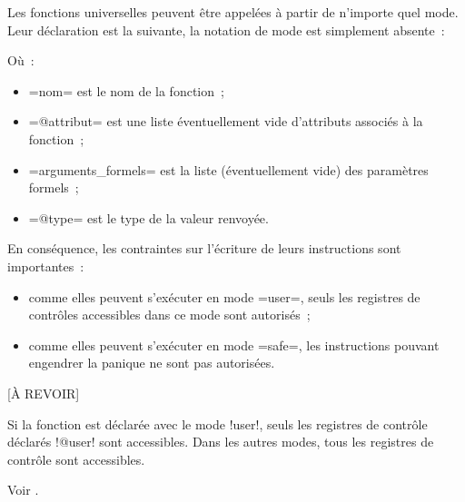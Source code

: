 
Les fonctions universelles peuvent être appelées à partir de n'importe quel mode. Leur déclaration est la suivante, la notation de mode est simplement absente~:

Où~:
\begin{itemize}
  \item \plm=nom= est le nom de la fonction~;
  \item \plm=@attribut= est une liste éventuellement vide d'attributs associés à la fonction~;
  \item \plm=arguments_formels= est la liste (éventuellement vide) des paramètres formels~;
  \item \plm=@type= est le type de la valeur renvoyée.
\end{itemize}

En conséquence, les contraintes sur l'écriture de leurs instructions sont importantes~:
\begin{itemize}
  \item comme elles peuvent s'exécuter en mode \plm=user=, seuls les registres de contrôles accessibles dans ce mode sont autorisés~;
  \item comme elles peuvent s'exécuter en mode \plm=safe=, les instructions pouvant engendrer la panique ne sont pas autorisées.
\end{itemize}














[À REVOIR]

Si la fonction est déclarée avec le mode \plm!user!, seuls les registres de contrôle déclarés \plm!@user! sont accessibles. Dans les autres modes, tous les registres de contrôle sont accessibles.



Voir .

